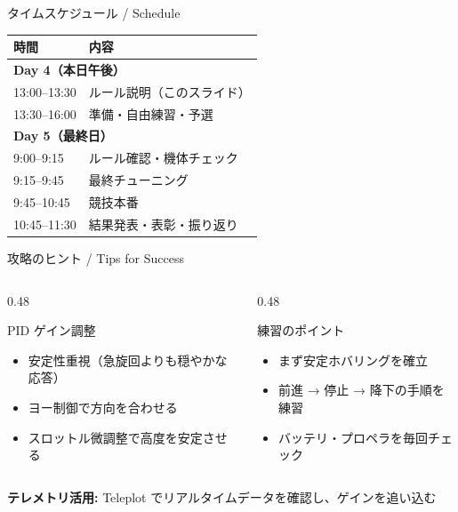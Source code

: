 \begin{frame}{タイムスケジュール / Schedule}
  \centering
  \begin{tabular}{ll}
    \hline
    \textbf{時間} & \textbf{内容} \\
    \hline
    \multicolumn{2}{l}{\textbf{Day 4（本日午後）}} \\
    13:00--13:30 & ルール説明（このスライド） \\
    13:30--16:00 & 準備・自由練習・予選 \\
    \hline
    \multicolumn{2}{l}{\textbf{Day 5（最終日）}} \\
    \phantom{0}9:00--\phantom{0}9:15 & ルール確認・機体チェック \\
    \phantom{0}9:15--\phantom{0}9:45 & 最終チューニング \\
    \phantom{0}9:45--10:45 & 競技本番 \\
    10:45--11:30 & 結果発表・表彰・振り返り \\
    \hline
  \end{tabular}
\end{frame}

\begin{frame}{攻略のヒント / Tips for Success}
  \begin{columns}[t]
    \begin{column}{0.48\textwidth}
      \begin{exampleblock}{PID ゲイン調整}
        \begin{itemize}
          \item 安定性重視（急旋回よりも穏やかな応答）
          \item ヨー制御で方向を合わせる
          \item スロットル微調整で高度を安定させる
        \end{itemize}
      \end{exampleblock}
    \end{column}
    \begin{column}{0.48\textwidth}
      \begin{exampleblock}{練習のポイント}
        \begin{itemize}
          \item まず安定ホバリングを確立
          \item 前進 → 停止 → 降下の手順を練習
          \item バッテリ・プロペラを毎回チェック
        \end{itemize}
      \end{exampleblock}
    \end{column}
  \end{columns}

  \smallskip
  {\small \textbf{テレメトリ活用:}
    Teleplot でリアルタイムデータを確認し、ゲインを追い込む}
\end{frame}

